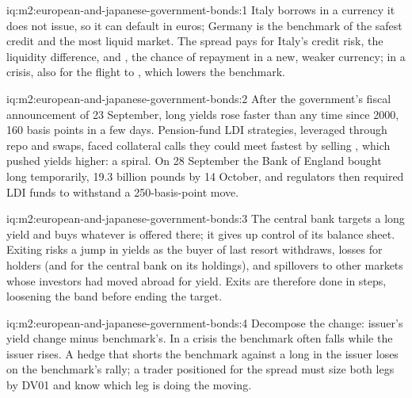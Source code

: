 \begin{solution}{iq:m2:european-and-japanese-government-bonds:1}
Italy borrows in a currency it does not issue, so it can default in euros;
Germany is the benchmark of the safest credit and the most liquid market. The
spread pays for Italy's credit risk, the liquidity difference, and
, the chance of repayment in a new, weaker currency; in a
crisis, also for the flight to , which lowers the benchmark.
\end{solution}

\begin{solution}{iq:m2:european-and-japanese-government-bonds:2}
After the government's fiscal announcement of 23 September, long  yields
rose faster than any time since 2000, 160 basis points in a few days.
Pension-fund LDI strategies, leveraged through repo and swaps, faced
collateral calls they could meet fastest by selling , which pushed yields
higher: a spiral. On 28 September the Bank of England bought long 
temporarily, 19.3 billion pounds by 14 October, and regulators then required
LDI funds to withstand a 250-basis-point move.
\end{solution}

\begin{solution}{iq:m2:european-and-japanese-government-bonds:3}
The central bank targets a long yield and buys whatever is offered there; it
gives up control of its balance sheet. Exiting risks a jump in yields as the
buyer of last resort withdraws, losses for holders (and for the central bank
on its holdings), and spillovers to other markets whose investors had moved
abroad for yield. Exits are therefore done in steps, loosening the band
before ending the target.
\end{solution}

\begin{solution}{iq:m2:european-and-japanese-government-bonds:4}
Decompose the change: issuer's yield change minus benchmark's. In a crisis the
benchmark often falls while the issuer rises. A hedge that shorts the
benchmark against a long in the issuer loses on the benchmark's rally; a
trader positioned for the spread must size both legs by DV01 and know which leg
is doing the moving.
\end{solution}

